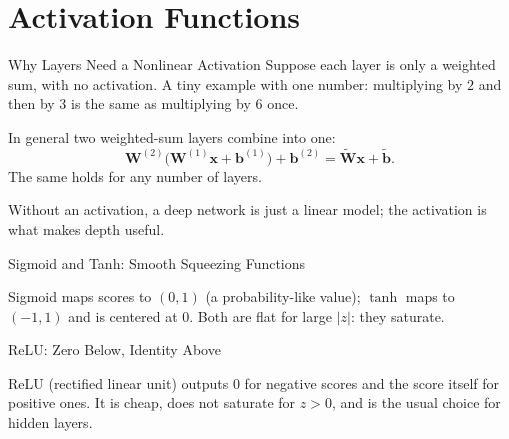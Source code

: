 \documentclass{ntuabeamer}
\begin{document}
\section{Activation Functions}

\begin{frame}{Why Layers Need a Nonlinear Activation}
  Suppose each layer is only a weighted sum, with no activation. A tiny example with one number:
  multiplying by $2$ and then by $3$ is the same as multiplying by $6$ once.

  In general two weighted-sum layers combine into one:
  \[
    \mathbf W^{(2)}\bigl(\mathbf W^{(1)}\mathbf x+\mathbf b^{(1)}\bigr)+\mathbf b^{(2)}
    =\widetilde{\mathbf W}\mathbf x+\widetilde{\mathbf b}.
  \]
  The same holds for any number of layers.

  Without an activation, a deep network is just a linear model; the activation is what makes depth useful.
\end{frame}

\begin{frame}{Sigmoid and Tanh: Smooth Squeezing Functions}
  \centering
  \par\vspace{0.1cm}
  Sigmoid maps scores to $(0,1)$ (a probability-like value); $\tanh$ maps to $(-1,1)$ and is centered at 0.
  Both are flat for large $|z|$: they saturate.
\end{frame}

\begin{frame}{ReLU: Zero Below, Identity Above}
  \centering
  \par\vspace{0.1cm}
  ReLU (rectified linear unit) outputs $0$ for negative scores and the score itself for positive ones.
  It is cheap, does not saturate for $z>0$, and is the usual choice for hidden layers.
\end{frame}
\end{document}
